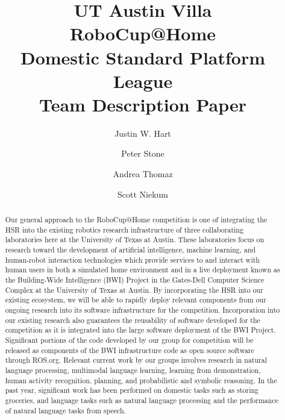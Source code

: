 \documentclass[runningheads,a4paper]{llncs}
\begin{document}
\title{UT Austin Villa\\ RoboCup@Home\\ Domestic Standard Platform League \\Team Description Paper}

\author{Justin W. Hart\and Peter Stone\and Andrea Thomaz\and Scott Niekum}
\maketitle



\begin{abstract}
Our general approach to the RoboCup@Home competition is one of integrating the HSR into the existing robotics research infrastructure of three collaborating laboratories here at the University of Texas at Austin. These laboratories focus on research toward the development of artificial intelligence, machine learning, and human-robot interaction technologies which provide services to and interact with human users in both a simulated home environment and in a live deployment known as the Building-Wide Intelligence (BWI) Project in the Gates-Dell Computer Science Complex at the University of Texas at Austin. By incorporating the HSR into our existing ecosystem, we will be able to rapidly deploy relevant components from our ongoing research into its software infrastructure for the competition. Incorporation into our existing research also guarantees the reusability of software developed for the competition as it is integrated into the large software deployment of the BWI Project. Significant portions of the code developed by our group for competition will be released as components of the BWI infrastructure code as open source software through ROS.org. Relevant current work by our groups involves research in natural language processing, multimodal language learning, learning from demonstration, human activity recognition, planning, and probabilistic and symbolic reasoning. In the past year, significant work has been performed on domestic tasks such as storing groceries, and language tasks such as natural language processing and the performance of natural language tasks from speech.


\end{abstract}
\end{document}
